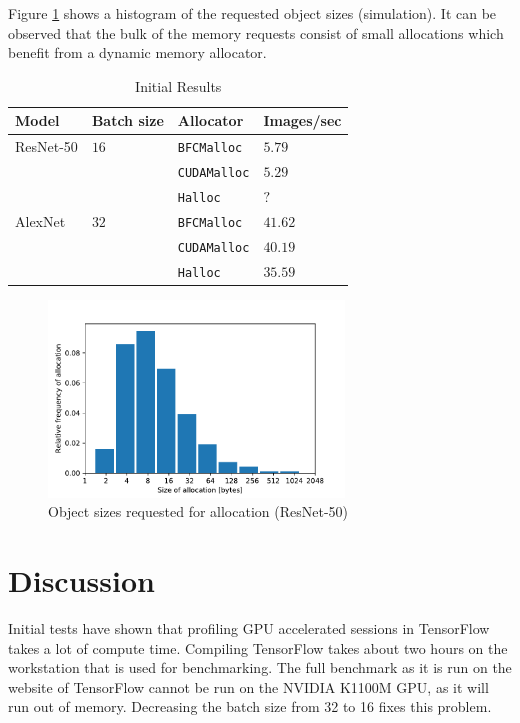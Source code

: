 \documentclass[12pt,twoside]{article}
\newcommand{\resnettimebfc}{$5.79$}     %
\newcommand{\resnettimecuda}{$5.29$}    %
\newcommand{\resnettimehalloc}{$?$}     %
\newcommand{\alexnettimebfc}{$41.62$}   %
\newcommand{\alexnettimecuda}{$40.19$}  %
\newcommand{\alexnettimehalloc}{$35.59$}%
\begin{document}
Figure \ref{fig:hist} shows a histogram of the requested object sizes (simulation). It can be observed that the bulk of the memory requests consist of small allocations which benefit from a dynamic memory allocator.

\begin{table}[!ht]
\centering
\caption{Initial Results}
\label{tab:results}
\begin{tabular}{|l|l|l|l|}
\hline
Model     & Batch size  & Allocator          & Images/sec         \\ \hline
ResNet-50 & $16$        & \texttt{BFCMalloc} & \resnettimebfc     \\ \cline{3-4} 
          &             & \texttt{CUDAMalloc}  & \resnettimecuda    \\ \cline{3-4} 
          &             & \texttt{Halloc}    & \resnettimehalloc  \\ \hline
AlexNet   & $32$        & \texttt{BFCMalloc} & \alexnettimebfc    \\ \cline{3-4} 
          &             & \texttt{CUDAMalloc}  & \alexnettimecuda   \\ \cline{3-4} 
          &             & \texttt{Halloc}    & \alexnettimehalloc \\ \hline
\end{tabular}
\end{table}

\begin{figure}[!ht]
  \centering
    \includegraphics[width=0.7\textwidth]{../Quantitative Python/histogram.pdf}
  \caption{Object sizes requested for allocation (ResNet-50)}
  \label{fig:hist}
\end{figure}

\section{Discussion}
\label{sec:discussion}
Initial tests have shown that profiling GPU accelerated sessions in TensorFlow takes a lot of compute time. Compiling TensorFlow takes about two hours on the workstation that is used for benchmarking. The full benchmark as it is run on the website of TensorFlow cannot be run on the NVIDIA K1100M GPU, as it will run out of memory. Decreasing the batch size from 32 to 16 fixes this problem.
\end{document}
